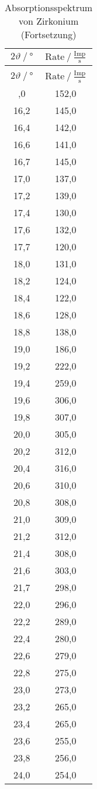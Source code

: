 \begin{longtable}{ S S }
   \caption{Absorptionsspektrum von Zirkonium}
   \label{tab:zir} \\
    \toprule
 {$2\vartheta\:/\: \mathrm{°}$} & {$\text{Rate}\:/\: \mathrm{\frac{Imp}{s}}$} \\
    \midrule
  \endfirsthead
    \caption{Absorptionsspektrum von Zirkonium (Fortsetzung)} \\
    \toprule
 {$2\vartheta\:/\: \mathrm{°}$} & {$\text{Rate}\:/\: \mathrm{\frac{Imp}{s}}$} \\
    \midrule
  \endhead
    \midrule
  \endfoot
    \bottomrule
  ,0 & 152,0 \\
    16,2 & 145,0 \\
    16,4 & 142,0 \\
    16,6 & 141,0 \\
    16,7 & 145,0 \\
    17,0 & 137,0 \\
    17,2 & 139,0 \\
    17,4 & 130,0 \\
    17,6 & 132,0 \\
    17,7 & 120,0 \\
    18,0 & 131,0 \\
    18,2 & 124,0 \\
    18,4 & 122,0 \\
    18,6 & 128,0 \\
    18,8 & 138,0 \\
    19,0 & 186,0 \\
    19,2 & 222,0 \\
    19,4 & 259,0 \\
    19,6 & 306,0 \\
    19,8 & 307,0 \\
    20,0 & 305,0 \\
    20,2 & 312,0 \\
    20,4 & 316,0 \\
    20,6 & 310,0 \\
    20,8 & 308,0 \\
    21,0 & 309,0 \\
    21,2 & 312,0 \\
    21,4 & 308,0 \\
    21,6 & 303,0 \\
    21,7 & 298,0 \\
    22,0 & 296,0 \\
    22,2 & 289,0 \\
    22,4 & 280,0 \\
    22,6 & 279,0 \\
    22,8 & 275,0 \\
    23,0 & 273,0 \\
    23,2 & 265,0 \\
    23,4 & 265,0 \\
    23,6 & 255,0 \\
    23,8 & 256,0 \\
    24,0 & 254,0 \\
\end{longtable}
